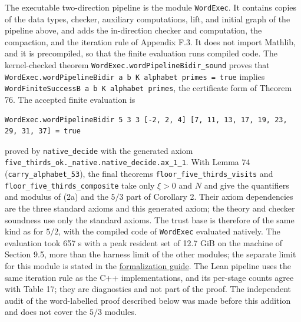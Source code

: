 \documentclass[11pt,reqno]{amsart}
\theoremstyle{definition}
\theoremstyle{remark}
\begin{document}
The executable two-direction pipeline is the module \nolinkurl{WordExec}. It
contains copies of the data types, checker, auxiliary computations, lift, and
initial graph of the pipeline above, and adds the in-direction checker and
computation, the compaction, and the iteration rule of Appendix F.3. It does
not import Mathlib, and it is precompiled, so that the finite evaluation runs
compiled code. The kernel-checked theorem
\nolinkurl{WordExec.wordPipelineBidir_sound} proves that
\texttt{WordExec.wordPipelineBidir\ a\ b\ K\ alphabet\ primes\ =\ true} implies
\texttt{WordFiniteSuccessB\ a\ b\ K\ alphabet\ primes}, the certificate form of
Theorem 76. The accepted finite evaluation is
\begin{Verbatim}[fontsize=\small,breaklines=true,breakanywhere=true]
WordExec.wordPipelineBidir 5 3 3 [-2, 2, 4] [7, 11, 13, 17, 19, 23, 29, 31, 37] = true
\end{Verbatim}
proved by \nolinkurl{native_decide} with the generated axiom
\nolinkurl{five_thirds_ok._native.native_decide.ax_1_1}. With Lemma 74
(\nolinkurl{carry_alphabet_53}), the final theorems
\nolinkurl{floor_five_thirds_visits} and \nolinkurl{floor_five_thirds_composite}
take only \(\xi>0\) and \(N\) and give the quantifiers and modulus of (2a) and
the \(5/3\) part of Corollary 2. Their axiom dependencies are the three
standard axioms and this generated axiom; the theory and checker soundness use
only the standard axioms. The trust base is therefore of the same kind as for
\(5/2\), with the compiled code of \nolinkurl{WordExec} evaluated natively. The
evaluation took 657 s with a peak resident set of 12.7 GiB on the
machine of Section 9.5, more than the harness limit of the other modules; the
separate limit for this module is stated in the
\href{supplement/FORMALIZATION.md}{formalization guide}. The Lean pipeline uses
the same iteration rule as the C++ implementations, and its per-stage counts
agree with Table 17; they are diagnostics and not part of the proof.
The independent audit of the word-labelled proof described below was made
before this addition and does not cover the \(5/3\) modules.
\end{document}
